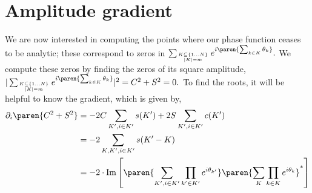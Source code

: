 \documentclass[onecolumn,amsmath,amssymb,nofootinbib,floatfix]{revtex4}
\begin{document}
\section{Amplitude gradient}

We are now interested in computing the points where our phase function ceases to be analytic;  these correspond to zeros in $\sum_{K\subseteq \{1\dots N\}\atop |K|=m} e^{i\paren{\sum_{k\in K} \theta_k}}.$  We compute these zeros by finding the zeros of its square amplitude, $|\sum_{K\subseteq \{1\dots N\}\atop |K|=m} e^{i\paren{\sum_{k\in K} \theta_k}}|^2=C^2+S^2=0.$  To find the roots, it will be helpful to know the gradient, which is given by,
$$
\begin{aligned}
\partial_i \paren{C^2+S^2}
&= -2C\sum_{K',i\in K'} s(K') + 2S\sum_{K',i\in K'} c(K') \\
&= -2\sum_{K,K',i\in K'} s(K'-K) \\
&= -2\cdot\text{Im}\left[\paren{\sum_{K',i\in K'}\prod_{k'\in K'}e^{i\theta_{k'}}}\paren{\sum_{K}\prod_{k\in K}e^{i\theta_k}}^*\right]
\end{aligned}
$$
\end{document}
